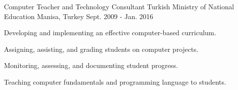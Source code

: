 \begin{cventries}
  \cventry
    {Computer Teacher and Technology Consultant} %
    {Turkish Ministry of National Education} %
    {Manisa, Turkey} %
    {Sept. 2009 - Jan. 2016} %
    {
      \begin{cvitems} %
        \item {Developing and implementing an effective computer-based curriculum.}
\item {Assigning, assisting, and grading students on computer projects.}
\item {Monitoring, assessing, and documenting student progress.}
\item {Teaching computer fundamentals and programming language to students.}\end{cvitems}}\end{cventries}
